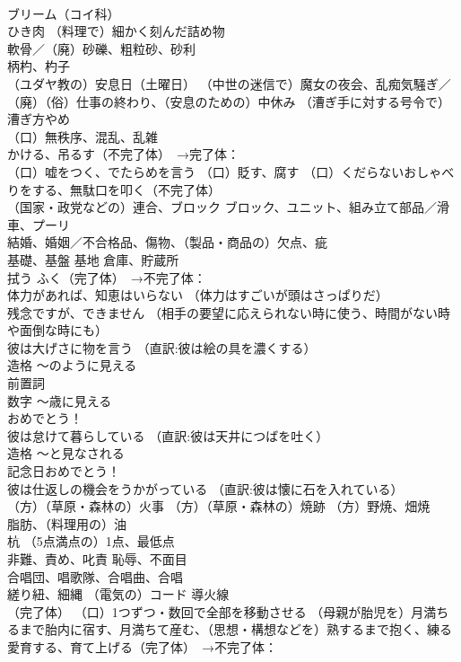 \documentclass[8pt]{extreport}
\begin{document}
\begin{CJK}{UTF8}{min}
\\	ブリーム（コイ科）
\\	ひき肉 （料理で）細かく刻んだ詰め物
\\	軟骨／（廃）砂礫、粗粒砂、砂利
\\	柄杓、杓子
\\	（ユダヤ教の）安息日（土曜日） （中世の迷信で）魔女の夜会、乱痴気騒ぎ／（廃）（俗）仕事の終わり、（安息のための）中休み （漕ぎ手に対する号令で）漕ぎ方やめ
\\	（口）無秩序、混乱、乱雑
\\	かける、吊るす（不完了体）　→完了体：
\\	（口）嘘をつく、でたらめを言う （口）貶す、腐す （口）くだらないおしゃべりをする、無駄口を叩く（不完了体）
\\	（国家・政党などの）連合、ブロック ブロック、ユニット、組み立て部品／滑車、プーリ
\\	結婚、婚姻／不合格品、傷物、（製品・商品の）欠点、疵
\\	基礎、基盤 基地 倉庫、貯蔵所
\\	拭う ふく（完了体）　→不完了体：
\\	体力があれば、知恵はいらない （体力はすごいが頭はさっぱりだ）
\\	残念ですが、できません （相手の要望に応えられない時に使う、時間がない時や面倒な時にも）
\\	彼は大げさに物を言う （直訳:彼は絵の具を濃くする）
\\	造格	〜のように見える
\\	前置詞 
\\	数字	〜歳に見える
\\	おめでとう！
\\	彼は怠けて暮らしている （直訳:彼は天井につばを吐く）
\\	造格	〜と見なされる
\\	記念日おめでとう！
\\	彼は仕返しの機会をうかがっている （直訳:彼は懐に石を入れている）
\\	（方）（草原・森林の）火事 （方）（草原・森林の）焼跡 （方）野焼、畑焼
\\	脂肪、（料理用の）油
\\	杭 （5点満点の）1点、最低点
\\	非難、責め、叱責 恥辱、不面目
\\	合唱団、唱歌隊、合唱曲、合唱
\\	縒り紐、細縄 （電気の）コード 導火線
\\	（完了体）	（口）1つずつ・数回で全部を移動させる （母親が胎児を）月満ちるまで胎内に宿す、月満ちて産む、（思想・構想などを）熟するまで抱く、練る 愛育する、育て上げる（完了体）　→不完了体：

\end{CJK}
\end{document}
